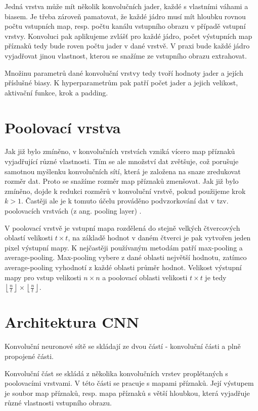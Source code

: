 Jedná vrstva může mít několik konvolučních jader, každé s vlastními váhami a
biasem. Je třeba zároveň pamatovat, že každé jádro musí mít hloubku rovnou
počtu vstupních map, resp. počtu kanálu vstupního obrazu v případě vstupní
vrstvy. Konvoluci pak aplikujeme zvlášť pro každé jádro, počet výstupních map
příznaků tedy bude roven počtu jader v dané vrstvě. V praxi bude každé jádro
vyjadřovat jinou vlastnost, kterou se snažíme ze vstupního obrazu extrahovat.

Množinu parametrů dané konvoluční vrstvy tedy tvoří hodnoty jader a jejích
příslušné biasy. K hyperparametrům pak patří počet jader a jejich velikost,
aktivační funkce, krok a padding.

\section{Poolovací vrstva}
Jak již bylo zmíněno, v konvolučních vrstvách vzniká vícero map příznaků
vyjadřující různé vlastnosti. Tím se ale množství dat zvětšuje, což porušuje
samotnou myšlenku konvolučních sítí, která je založena na snaze zredukovat
rozměr dat. Proto se snažíme rozměr map příznaků zmenšovat. Jak již bylo
zmíněno, dojde k redukci rozměrů v konvoluční vrstvě, pokud použijeme krok $k >
    1$. Častěji ale je k tomuto účelu prováděno podvzorkování dat v tzv.
poolovacích vrstvách (z ang. pooling layer) \cite{rawat2017deep}.

V poolovací vrstvě je vstupní mapa rozdělená do stejně velkých čtvercových
oblastí velikosti $t \times t$, na základě hodnot v daném čtverci je pak
vytvořen jeden pixel výstupní mapy. K nejčastěji používaným metodám patří
max-pooling a average-pooling. Max-pooling vybere z dané oblasti největší
hodnotu, zatímco average-pooling vyhodnotí z každé oblasti průměr hodnot.
Velikost výstupní mapy pro vstup velikosti $n \times n$ a poolovací oblasti
velikosti $t \times t$ je tedy $\left\lfloor \frac{n}{t} \right\rfloor \times
    \left\lfloor \frac{n}{t} \right\rfloor$.

\section{Architektura CNN}

Konvoluční neuronové sítě se skládají ze dvou částí - konvoluční části a plně
propojené části.

Konvoluční část se skládá z několika konvolučních vrstev proplétaných s
poolovacími vrstvami. V této části se pracuje s mapami příznaků. Její výstupem
je soubor map příznaků, resp. mapa příznaků s větší hloubkou, která vyjadřuje
různé vlastnosti vstupního obrazu.

